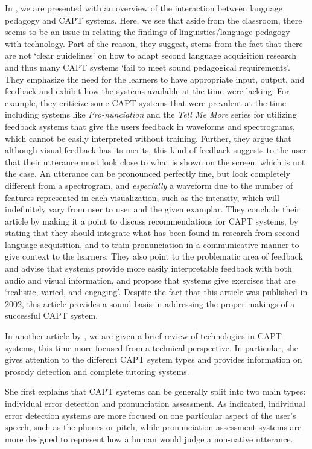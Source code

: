 \documentclass
[
    a4paper,
    twoside,
    12pt
]
{report}
\begin{document}
In \textcite{neri2002}, we are presented with an overview of the
interaction between language pedagogy and CAPT systems. Here, we see
that aside from the classroom, there seems to be an issue in relating
the findings of linguistics/language pedagogy with technology. Part of
the reason, they suggest, stems from the fact that there are not `clear
guidelines' on how to adapt second language acquisition research and
thus many CAPT systems `fail to meet sound pedagogical requirements'.
They emphasize the need for the learners to have appropriate input,
output, and feedback and exhibit how the systems available at the time
were lacking. For example, they criticize some CAPT systems that were
prevalent at the time including systems like \textit{Pro-nunciation} and
the \textit{Tell Me More} series for utilizing feedback systems that
give the users feedback in waveforms and spectrograms, which cannot be
easily interpreted without training. Further, they argue that although
visual feedback has its merits, this kind of feedback suggests to the
user that their utterance must look close to what is shown on the
screen, which is not the case. An utterance can be pronounced perfectly
fine, but look completely different from a spectrogram, and
\textit{especially} a waveform due to the number of features represented
in each visualization, such as the intensity, which will indefinitely
vary from user to user and the given examplar. They conclude their
article by making it a point to discuss recommendations for CAPT
systems, by stating that they should integrate what has been found in
research from second language acquisition, and to train pronunciation in
a communicative manner to give context to the learners. They also point
to the problematic area of feedback and advise that systems provide more
easily interpretable feedback with both audio and visual information,
and propose that systems give exercises that are `realistic, varied, and
engaging'. Despite the fact that this article was published in 2002,
this article provides a sound basis in addressing the proper makings of
a successful CAPT system.

In another article by \textcite{eskenazi2009}, we are given a brief
review of technologies in CAPT systems, this time more focused from a
technical perspective. In particular, she gives attention to the
different CAPT system types and provides information on prosody
detection and complete tutoring systems.

She first explains that CAPT systems can be generally split into two
main types: individual error detection and pronunciation assessment. As
indicated, individual error detection systems are more focused on one
particular aspect of the user's speech, such as the phones or pitch,
while pronunciation assessment systems are more designed to represent
how a human would judge a non-native utterance.
\end{document}
